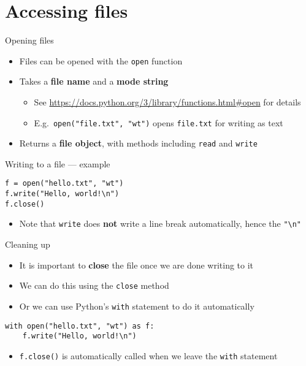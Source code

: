 \part{Accessing files}
\frame{\partpage}

\begin{frame}[fragile]{Opening files}
	\begin{itemize}
		\pause\item Files can be opened with the \lstinline{open} function
		\pause\item Takes a \textbf{file name} and a \textbf{mode string}
			\begin{itemize}
				\pause\item See \url{https://docs.python.org/3/library/functions.html#open} for details
				\pause\item E.g.\ \lstinline{open("file.txt", "wt")} opens \texttt{file.txt} for writing as text
			\end{itemize}
		\pause\item Returns a \textbf{file object}, with methods including \lstinline{read} and \lstinline{write}
	\end{itemize}
\end{frame}

\begin{frame}[fragile]{Writing to a file --- example}
	\begin{lstlisting}
f = open("hello.txt", "wt")
f.write("Hello, world!\n")
f.close()
	\end{lstlisting}
	\begin{itemize}
		\pause\item Note that \lstinline{write} does \textbf{not} write a line break automatically, hence the \lstinline{"\n"}
	\end{itemize}
\end{frame}

\begin{frame}[fragile]{Cleaning up}
	\begin{itemize}
		\pause\item It is important to \textbf{close} the file once we are done writing to it
		\pause\item We can do this using the \lstinline{close} method
		\pause\item Or we can use Python's \lstinline{with} statement to do it automatically
	\end{itemize}
	\pause
	\begin{lstlisting}
with open("hello.txt", "wt") as f:
	f.write("Hello, world!\n")
	\end{lstlisting}
	\begin{itemize}
		\pause\item \lstinline{f.close()} is automatically called when we leave the \lstinline{with} statement
	\end{itemize}
\end{frame}

